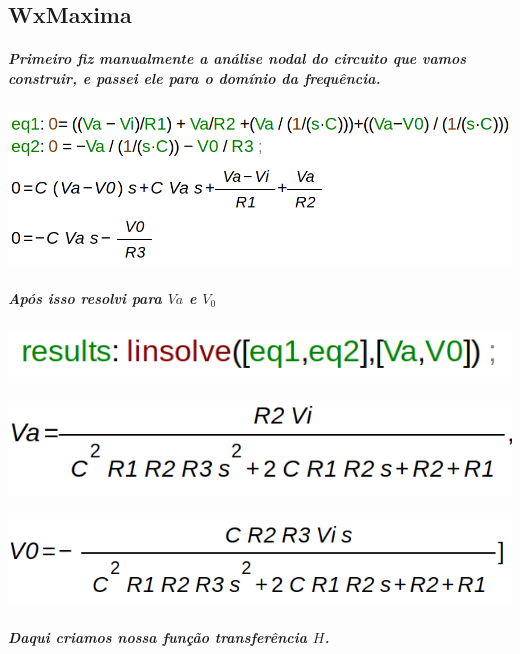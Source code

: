 \documentclass[12pt,twoside, a4paper, twocolumn]{article}
\begin{document}
\subsection{WxMaxima}


\subparagraph*{Primeiro fiz manualmente a análise nodal do circuito que vamos construir, e passei ele para o domínio da frequência.}
\subparagraph*{}


\begin{adjustbox}{scale=0.26}
    \includegraphics{eqs.png}
\end{adjustbox}


\subparagraph*{Após isso resolvi para $Va$ e $V_0$}


\subparagraph*{}


\begin{adjustbox}{scale=0.33}
    \includegraphics{linsolve.png}
\end{adjustbox}


\begin{adjustbox}{scale=0.33}
    \includegraphics{va.png}
\end{adjustbox}


\begin{adjustbox}{scale=0.33}
    \includegraphics{v0.png}
\end{adjustbox}


\subparagraph*{Daqui criamos nossa função transferência $H$.}
\end{document}
